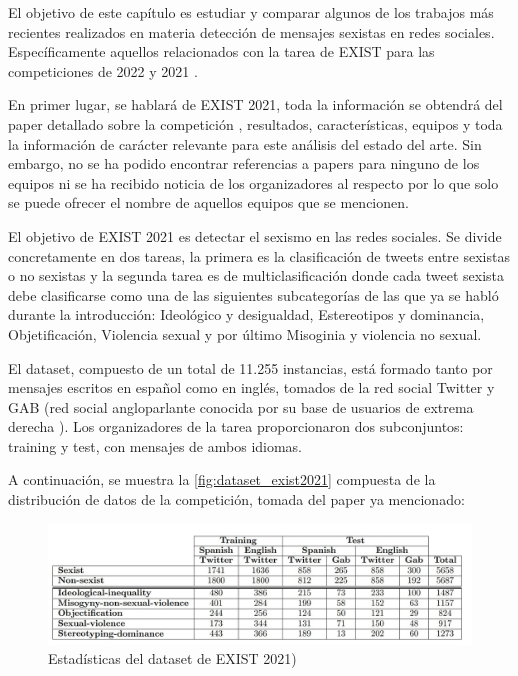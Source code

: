 El objetivo de este capítulo es estudiar y comparar algunos de los trabajos más recientes realizados en materia detección de mensajes sexistas en redes sociales. Específicamente aquellos relacionados con la tarea de EXIST para las competiciones de 2022 \cite{rodriguez2022overview} y 2021 \cite{rodriguez2021overview}. 

En primer lugar, se hablará de EXIST 2021, toda la información se obtendrá del paper detallado sobre la competición \cite{rodriguez2021overview}, resultados, características, equipos y toda la información de carácter relevante para este análisis del estado del arte. Sin embargo, no se ha podido encontrar referencias a papers para ninguno de los equipos ni se ha recibido noticia de los organizadores al respecto por lo que solo se puede ofrecer el nombre de aquellos equipos que se mencionen.

 El objetivo de EXIST 2021 es detectar el sexismo en las redes sociales. Se divide concretamente en dos tareas, la primera es la clasificación de tweets entre sexistas o no sexistas y la segunda tarea es de multiclasificación donde cada tweet sexista debe clasificarse como una de las siguientes subcategorías de las que ya se habló durante la introducción: Ideológico y desigualdad, Estereotipos y dominancia, Objetificación, Violencia sexual y por último Misoginia y violencia no sexual.

El dataset, compuesto de un total de 11.255 instancias,  está formado tanto por mensajes escritos en español como en inglés, tomados de la red social Twitter y GAB (red social angloparlante conocida por su base de usuarios de extrema derecha \cite{zhou2019elites}). Los organizadores de la tarea proporcionaron dos subconjuntos: training y test, con mensajes de ambos idiomas. 

A continuación, se muestra la \autoref{fig:dataset_exist2021} compuesta de la distribución de datos de la competición, tomada del paper ya mencionado\cite{rodriguez2021overview}:

\begin{figure}[H]
    \centering
    \includegraphics[width=16cm]{imagenes/Arte/dataset_exist2021.jpg}
    \caption{\centering Estadísticas del dataset de EXIST 2021)}
  \label{fig:dataset_exist2021}  
\end{figure}

